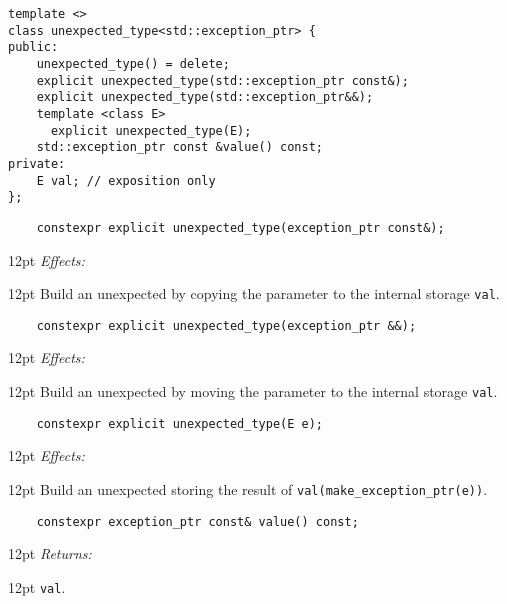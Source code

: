 \documentclass[a4paper,10pt]{article}
\newcommand{\cpp}[1]{\lstinline{#1}}
\newcommand{\wordingItem}[1]{\noindent\textit{#1:}}
\newenvironment{wordingTextItem}[1]{\wordingItem{#1}\vspace{2pt}\noindent\begin{adjustwidth}{12pt}{}}{\vspace{2pt}\end{adjustwidth}}
\newenvironment{wordingPara}{\begin{adjustwidth}{12pt}{}}{\end{adjustwidth}}
\begin{document}
\begin{lstlisting}
template <>
class unexpected_type<std::exception_ptr> {
public:
    unexpected_type() = delete;
    explicit unexpected_type(std::exception_ptr const&);
    explicit unexpected_type(std::exception_ptr&&);
    template <class E>
      explicit unexpected_type(E);     
    std::exception_ptr const &value() const;                              
private:
    E val; // exposition only
}; 
\end{lstlisting}
\noindent

\begin{lstlisting}
    constexpr explicit unexpected_type(exception_ptr const&);   
\end{lstlisting}
\begin{wordingPara}
\begin{wordingTextItem}{Effects}
Build an unexpected by copying the parameter to the internal storage \cpp{val}.
\end{wordingTextItem}
\end{wordingPara}

\begin{lstlisting}
    constexpr explicit unexpected_type(exception_ptr &&);   
\end{lstlisting}
\begin{wordingPara}
\begin{wordingTextItem}{Effects}
Build an unexpected by moving the parameter to the internal storage \cpp{val}.
\end{wordingTextItem}
\end{wordingPara}

\begin{lstlisting}
    constexpr explicit unexpected_type(E e);   
\end{lstlisting}
\begin{wordingPara}
\begin{wordingTextItem}{Effects}
Build an unexpected storing the result of \cpp{val(make_exception_ptr(e))}.
\end{wordingTextItem}
\end{wordingPara}

\begin{lstlisting}
    constexpr exception_ptr const& value() const;                              
\end{lstlisting}
\begin{wordingPara}
\begin{wordingTextItem}{Returns}
\cpp{val}.
\end{wordingTextItem}
\end{wordingPara}
\end{document}
